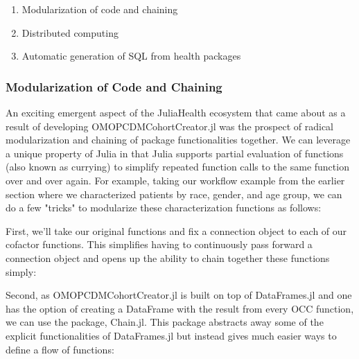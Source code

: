 \documentclass{juliacon}
\begin{document}
\begin{enumerate}

\item Modularization of code and chaining

\item Distributed computing

\item Automatic generation of SQL from health packages

\end{enumerate}

\subsubsection{Modularization of Code and Chaining}

An exciting emergent aspect of the JuliaHealth ecosystem that came about as a result of developing OMOPCDMCohortCreator.jl was the prospect of radical modularization and chaining of package functionalities together.
We can leverage a unique property of Julia in that Julia supports partial evaluation of functions (also known as currying) to simplify repeated function calls to the same function over and over again.
For example, taking our workflow example from the earlier section where we characterized patients by race, gender, and age group, we can do a few "tricks" to modularize these characterization functions as follows:

First, we'll take our original functions and fix a connection object to each of our cofactor functions.
This simplifies having to continuously pass forward a connection object and opens up the ability to chain together these functions simply:

Second, as OMOPCDMCohortCreator.jl is built on top of DataFrames.jl and one has the option of creating a DataFrame with the result from every OCC function, we can use the package, Chain.jl.
This package abstracts away some of the explicit functionalities of DataFrames.jl but instead gives much easier ways to define a flow of functions:
\end{document}
